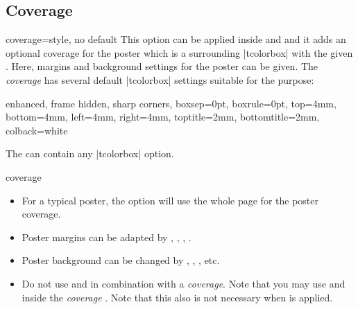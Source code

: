 \subsection{Coverage}\label{subsec:poster_coverage}

\begin{postersetTcbKey}[][doc new=2017-07-03]{coverage}{=}{style, no default}
  This option can be applied inside  and 
  and it adds an optional coverage for the poster which is a surrounding |tcolorbox|
  with the given . Here, margins and background settings
  for the poster can be given.
  The \emph{coverage} has several default |tcolorbox| settings
  suitable for the purpose:
\begin{dispListing}
enhanced, frame hidden, sharp corners, boxsep=0pt, boxrule=0pt,
top=4mm, bottom=4mm, left=4mm, right=4mm,
toptitle=2mm, bottomtitle=2mm, colback=white
\end{dispListing}

The  can contain any |tcolorbox| option.

\begin{exdispExample}{coverage}
\begin{tcbposter}[
  poster   = {showframe,spacing=1mm},
  coverage = {height=5cm,
              interior style={top color=yellow,bottom color=yellow!50!red},
              watermark text={My Poster},watermark color=white,
             },
]
\end{tcbposter}
\end{exdispExample}

\begin{itemize}
\item For a typical poster, the option  will use the
  whole page for the poster coverage.
\item Poster margins can be adapted by , ,
  , .
\item Poster background can be changed by ,
  , , etc.
\item Do not use  and 
  in combination with a \emph{coverage}. Note that you may use
   and  inside
  the \emph{coverage} . Note that this also is not
  necessary when  is applied.
\end{itemize}
\end{postersetTcbKey}


